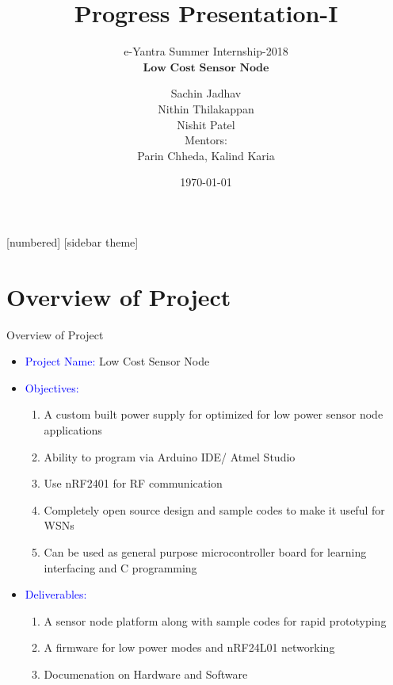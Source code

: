 \documentclass[10pt, a4paper]{beamer}
\begin{document}
	\title{Progress Presentation-I}
	\subtitle{e-Yantra Summer Internship-2018 \\ $ \textbf{Low Cost Sensor Node} $}
	\author{Sachin Jadhav\\Nithin Thilakappan\\Nishit Patel\\ \vspace{1em}
	Mentors: \\ Parin Chheda, Kalind Karia}
	\date{\today}
	\frame{\titlepage}

[numbered]
[sidebar theme]
\section{Overview of Project}
\begin{frame}{Overview of Project}
	\begin{itemize}
		\item \textcolor{blue}{Project Name:} Low Cost Sensor Node
		\item \textcolor{blue}{Objectives:}
        	\begin{enumerate}
        		\item A custom built power supply for optimized for low power sensor node applications
				\item Ability to program via Arduino IDE/ Atmel Studio
				\item Use nRF2401 for RF communication
				\item Completely open source design and sample codes to make it useful for WSNs
				\item Can be used as general purpose microcontroller board for learning interfacing and C
programming
                \end{enumerate}
		\item \textcolor{blue}{Deliverables:}
        \begin{enumerate}
        		\item A sensor node platform along with sample codes for rapid prototyping
				\item A firmware for low power modes and nRF24L01 networking
				\item Documenation on Hardware and Software
			
                \end{enumerate} 
	\end{itemize}
\end{frame}
\end{document}
